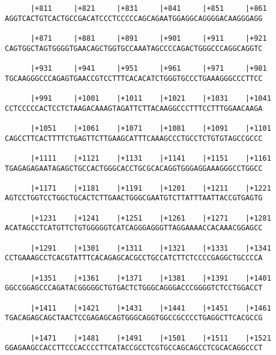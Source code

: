 \documentclass{article}
\begin{document}
\begin{Verbatim}
      |+811     |+821     |+831     |+841     |+851     |+861
AGGTCACTGTCACTGCCGACATCCCTCCCCCAGCAGAATGGAGGCAGGGGACAAGGGAGG
                                                            
      |+871     |+881     |+891     |+901     |+911     |+921
CAGTGGCTAGTGGGGTGAACAGCTGGTGCCAAATAGCCCCAGACTGGGCCCAGGCAGGTC
                                                            
      |+931     |+941     |+951     |+961     |+971     |+981
TGCAAGGGCCCAGAGTGAACCGTCCTTTCACACATCTGGGTGCCCTGAAAGGGCCCTTCC
                                                            
      |+991     |+1001    |+1011    |+1021    |+1031    |+1041
CCTCCCCCACTCCTCTAAGACAAAGTAGATTCTTACAAGGCCCTTTCCTTTGGAACAAGA
                                                            
      |+1051    |+1061    |+1071    |+1081    |+1091    |+1101
CAGCCTTCACTTTTCTGAGTTCTTGAAGCATTTCAAAGCCCTGCCTCTGTGTAGCCGCCC
                                                            
      |+1111    |+1121    |+1131    |+1141    |+1151    |+1161
TGAGAGAGAATAGAGCTGCCACTGGGCACCTGCGCACAGGTGGGAGGAAAGGGCCTGGCC
                                                            
      |+1171    |+1181    |+1191    |+1201    |+1211    |+1221
AGTCCTGGTCCTGGCTGCACTCTTGAACTGGGCGAATGTCTTATTTAATTACCGTGAGTG
                                                            
      |+1231    |+1241    |+1251    |+1261    |+1271    |+1281
ACATAGCCTCATGTTCTGTGGGGGTCATCAGGGAGGGTTAGGAAAACCACAAACGGAGCC
                                                            
      |+1291    |+1301    |+1311    |+1321    |+1331    |+1341
CCTGAAAGCCTCACGTATTTCACAGAGCACGCCTGCCATCTTCTCCCCGAGGCTGCCCCA
                                                            
      |+1351    |+1361    |+1371    |+1381    |+1391    |+1401
GGCCGGAGCCCAGATACGGGGGCTGTGACTCTGGGCAGGGACCCGGGGTCTCCTGGACCT
                                                            
      |+1411    |+1421    |+1431    |+1441    |+1451    |+1461
TGACAGAGCAGCTAACTCCGAGAGCAGTGGGCAGGTGGCCGCCCCTGAGGCTTCACGCCG
                                                            
      |+1471    |+1481    |+1491    |+1501    |+1511    |+1521
GGAGAAGCCACCTTCCCACCCCTTCATACCGCCTCGTGCCAGCAGCCTCGCACAGGCCCT
                                                            

\end{Verbatim}
\end{document}
